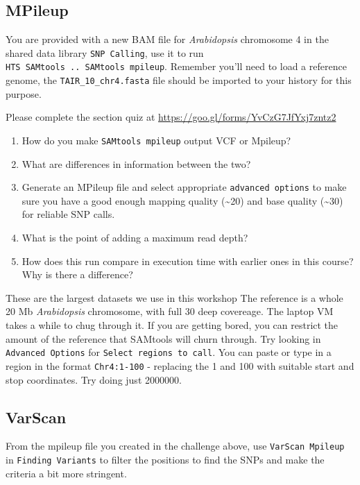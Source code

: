 \documentclass[12pt,]{book}
\providecommand{\tightlist}{%
  \setlength{\itemsep}{0pt}\setlength{\parskip}{0pt}}
\begin{document}
\subsection{MPileup}\label{mpileup-1}

You are provided with a new BAM file for \emph{Arabidopsis} chromosome 4
in the shared data library \texttt{SNP\ Calling}, use it to run
\texttt{HTS\ SAMtools\ ..\ SAMtools\ mpileup}. Remember you'll need to
load a reference genome, the \texttt{TAIR\_10\_chr4.fasta} file should
be imported to your history for this purpose.

Please complete the section quiz at
\url{https://goo.gl/forms/YvCzG7JfYxj7zntz2}

\begin{enumerate}
\def\labelenumi{\arabic{enumi}.}
\tightlist
\item
  How do you make \texttt{SAMtools\ mpileup} output VCF or Mpileup?
\item
  What are differences in information between the two?
\item
  Generate an MPileup file and select appropriate
  \texttt{advanced\ options} to make sure you have a good enough mapping
  quality (\textasciitilde{}20) and base quality (\textasciitilde{}30)
  for reliable SNP calls.
\item
  What is the point of adding a maximum read depth?
\item
  How does this run compare in execution time with earlier ones in this
  course? Why is there a difference?
\end{enumerate}

These are the largest datasets we use in this workshop The reference is
a whole 20 Mb \emph{Arabidopsis} chromosome, with full 30 deep
covereage. The laptop VM takes a while to chug through it. If you are
getting bored, you can restrict the amount of the reference that
SAMtools will churn through. Try looking in \texttt{Advanced\ Options}
for \texttt{Select\ regions\ to\ call}. You can paste or type in a
region in the format \texttt{Chr4:1-100} - replacing the 1 and 100 with
suitable start and stop coordinates. Try doing just 2000000.

\subsection{VarScan}\label{varscan}

From the mpileup file you created in the challenge above, use
\texttt{VarScan\ Mpileup} in \texttt{Finding\ Variants} to filter the
positions to find the SNPs and make the criteria a bit more stringent.
\end{document}
